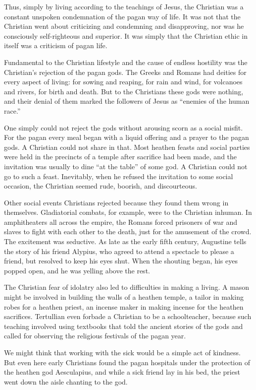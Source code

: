 Thus, simply by living according to the teachings of Jesus, the Christian was a constant unspoken
condemnation of the pagan way of life. It was not that the Christian went about criticizing and
condemning and disapproving, nor was he consciously self-righteous and superior. It was simply that
the Christian ethic in itself was a criticism of pagan life.

Fundamental to the Christian lifestyle and the cause of endless hostility was the Christian’s
rejection of the pagan gods. The Greeks and Romans had deities for every aspect of living: for
sowing and reaping, for rain and wind, for volcanoes and rivers, for birth and death. But to the
Christians these gods were nothing, and their denial of them marked the followers of Jesus as
“enemies of the human race.”

One simply could not reject the gods without arousing scorn as a social misfit. For the pagan every
meal began with a liquid offering and a prayer to the pagan gods. A Christian could not share in
that. Most heathen feasts and social parties were held in the precincts of a temple after sacrifice
had been made, and the invitation was usually to dine “at the table” of some god. A Christian could
not go to such a feast. Inevitably, when he refused the invitation to some social occasion, the
Christian seemed rude, boorish, and discourteous.

Other social events Christians rejected because they found them wrong in themselves. Gladiatorial
combats, for example, were to the Christian inhuman. In amphitheaters all across the empire, the
Romans forced prisoners of war and slaves to fight with each other to the death, just for the
amusement of the crowd. The excitement was seductive. As late as the early fifth century, Augustine
tells the story of his friend Alypius, who agreed to attend a spectacle to please a friend, but
resolved to keep his eyes shut. When the shouting began, his eyes popped open, and he was yelling
above the rest.

The Christian fear of idolatry also led to difficulties in making a living. A mason might be
involved in building the walls of a heathen temple, a tailor in making robes for a heathen priest,
an incense maker in making incense for the heathen sacrifices. Tertullian even forbade a Christian
to be a schoolteacher, because such teaching involved using textbooks that told the ancient stories
of the gods and called for observing the religious festivals of the pagan year.

We might think that working with the sick would be a simple act of kindness. But even here early
Christians found the pagan hospitals under the protection of the heathen god Aesculapius, and while
a sick friend lay in his bed, the priest went down the aisle chanting to the god.

